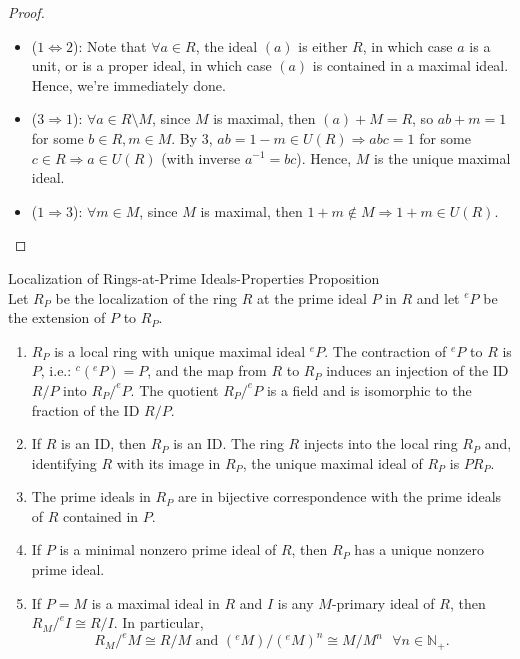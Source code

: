 \begin{proof}
    \begin{itemize}
        \item ($1 \Leftrightarrow 2$): Note that $\forall a\in R$, the ideal $(a)$ is either $R$, in which case $a$ is a unit, or is a proper ideal, in which case $(a)$ is contained in a maximal ideal. Hence, we're immediately done.

        \item ($3 \Rightarrow 1$): $\forall a \in R\setminus M$, since $M$ is maximal, then $(a)+M=R$, so $ab+m=1$ for some $b\in R, m\in M$. By 3, $ab= 1-m \in U(R) \Rightarrow abc=1$ for some $c \in R \Rightarrow a\in U(R)$ (with inverse $a^{-1} =bc$). Hence, $M$ is the unique maximal ideal.

        \item ($1\Rightarrow 3$): $\forall m\in M$, since $M$ is maximal, then $1+m \notin M \Rightarrow 1+m \in U(R)$.
    \end{itemize}
\end{proof}

\begin{proposition}{Localization of Rings-at-Prime Ideals-Properties Proposition}\\
Let $R_P$ be the localization of the ring $R$ at the prime ideal $P$ in $R$ and let $^eP$ be the extension of $P$ to $R_P$.
\begin{enumerate}
    \item $R_P$ is a local ring with unique maximal ideal $^eP$. The contraction of $^eP$ to $R$ is $P$, i.e.: $^c(^eP)=P$, and the map from $R$ to $R_P$ induces an injection of the ID $R/P$ into $R_P/^eP$. The quotient $R_P/^eP$ is a field and is isomorphic to the fraction of the ID $R/P$.

    \item If $R$ is an ID, then $R_P$ is an ID. The ring $R$ injects into the local ring $R_P$ and, identifying $R$ with its image in $R_P$, the unique maximal ideal of $R_P$ is $PR_P$.

    \item The prime ideals in $R_P$ are in bijective correspondence with the prime ideals of $R$ contained in $P$.

    \item If $P$ is a minimal nonzero prime ideal of $R$, then $R_P$ has a unique nonzero prime ideal.

    \item If $P=M$ is a maximal ideal in $R$ and $I$ is any $M$-primary ideal of $R$, then $R_M/^eI \cong R/I$. In particular, 
    \[
    R_M/^eM \cong R/M \text{ and } (^eM)/(^eM)^n \cong M/M^n \text{ } \forall n \in \mathbb{N}_+.
    \]
\end{enumerate}
\end{proposition}

